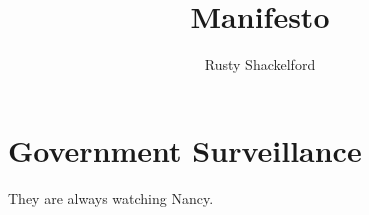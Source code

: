 \documentclass{report}
\title{Manifesto}
\author{Rusty Shackelford}
\begin{document}
\maketitle

\section{Government Surveillance}
They are always watching Nancy.
\end{document}
